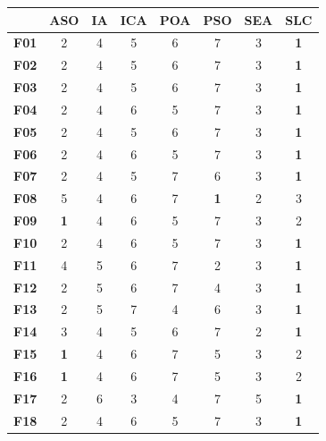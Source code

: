 \begin{table}
	\centering
	\begin{tabular}{cccccccc}
		\toprule
		{} &    \textbf{ASO} &     \textbf{IA} &    \textbf{ICA} &    \textbf{POA} &    \textbf{PSO} &    \textbf{SEA} &    \textbf{SLC} \\
		\midrule
		\textbf{F01}  &      2 &      4 &      5 &      6 &      7 &      3 &      \textbf{1} \\
		\textbf{F02}  &      2 &      4 &      5 &      6 &      7 &      3 &      \textbf{1} \\
		\textbf{F03}  &      2 &      4 &      5 &      6 &      7 &      3 &      \textbf{1} \\
		\textbf{F04}  &      2 &      4 &      6 &      5 &      7 &      3 &      \textbf{1} \\
		\textbf{F05}  &      2 &      4 &      5 &      6 &      7 &      3 &      \textbf{1} \\
		\midrule
		\textbf{F06}  &      2 &      4 &      6 &      5 &      7 &      3 &      \textbf{1} \\
		\textbf{F07}  &      2 &      4 &      5 &      7 &      6 &      3 &      \textbf{1} \\
		\textbf{F08}  &      5 &      4 &      6 &      7 &      \textbf{1} &      2 &      3 \\
		\textbf{F09}  &      \textbf{1} &      4 &      6 &      5 &      7 &      3 &      2 \\
		\textbf{F10}  &      2 &      4 &      6 &      5 &      7 &      3 &      \textbf{1} \\
		\textbf{F11}  &      4 &      5 &      6 &      7 &      2 &      3 &      \textbf{1} \\
		\textbf{F12}  &      2 &      5 &      6 &      7 &      4 &      3 &      \textbf{1} \\
		\midrule
		\textbf{F13}  &      2 &      5 &      7 &      4 &      6 &      3 &      \textbf{1} \\
		\textbf{F14}  &      3 &      4 &      5 &      6 &      7 &      2 &      \textbf{1} \\
		\midrule
		\textbf{F15}  &      \textbf{1} &      4 &      6 &      7 &      5 &      3 &      2 \\
		\textbf{F16}  &      \textbf{1} &      4 &      6 &      7 &      5 &      3 &      2 \\
		\textbf{F17}  &      2 &      6 &      3 &      4 &      7 &      5 &      \textbf{1} \\
		\textbf{F18}  &      2 &      4 &      6 &      5 &      7 &      3 &      \textbf{1} \\

\end{tabular}
\end{table}

